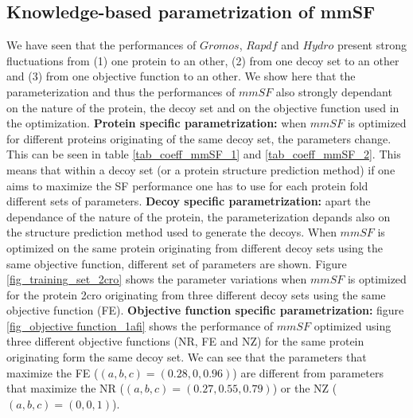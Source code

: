 \documentclass[a4paper,20pt,notitlepage,openbib]{article}
\begin{document}
\subsection{Knowledge-based parametrization of mmSF}
We have seen that the performances of $Gromos$, $Rapdf$ and $Hydro$ present strong fluctuations from (1) one protein to an other, (2) from one decoy set to an other and (3) from one objective function to an other. We show here that the parameterization and thus the performances of $mmSF$ also strongly dependant on the nature of the protein, the decoy set and on the objective function used in the optimization.
\textbf{Protein specific parametrization: } when $mmSF$ is optimized for different proteins originating of the same decoy set, the parameters change. This can be seen in table \ref{tab_coeff_mmSF_1} and \ref{tab_coeff_mmSF_2}. This means that within a decoy set (or a protein structure prediction method) if one aims to maximize the SF performance one has to use for each protein fold different sets of parameters.
\textbf{Decoy specific parametrization: } apart the dependance of the nature of the protein, the parameterization depands also on the structure prediction method used to generate the decoys. When $mmSF$ is optimized on the same protein originating from different decoy sets using the same objective function, different set of parameters are shown. Figure \ref{fig_training_set_2cro} shows the parameter variations when $mmSF$ is optimized for the protein 2cro originating from three different decoy sets using the same objective function (FE).
\textbf{Objective function specific parametrization:} figure \ref{fig_objective function_1afi} shows the performance of $mmSF$ optimized using three different objective functions (NR, FE and NZ) for the same protein originating form the same decoy set. We can see that the parameters that maximize the FE ($(a,b,c)=(0.28,0,0.96)$) are different from parameters that maximize the NR ($(a,b,c)=(0.27,0.55,0.79)$) or the NZ ($(a,b,c)=(0,0,1)$).
\end{document}
